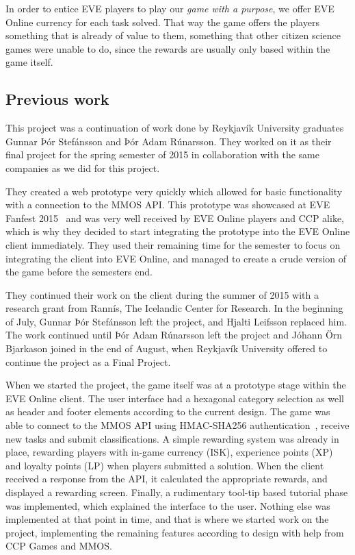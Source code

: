 In order to entice EVE players to play our \emph{game with a purpose}, we offer EVE Online currency for each task solved. That way the game offers the players something that is already of value to them, something that other citizen science games were unable to do, since the rewards are usually only based within the game itself.

\subsection{Previous work}
This project was a continuation of work done by Reykjavík University graduates Gunnar Þór Stefánsson and Þór Adam Rúnarsson. They worked on it as their final project for the spring semester of 2015 in collaboration with the same companies as we did for this project.

They created a web prototype very quickly which allowed for basic functionality with a connection to the MMOS API. This prototype was showcased at EVE Fanfest 2015~\cite{fanfest} and was very well received by EVE Online players and CCP alike, which is why they decided to start integrating the prototype into the EVE Online client immediately. They used their remaining time for the semester to focus on integrating the client into EVE Online, and managed to create a crude version of the game before the semesters end.

They continued their work on the client during the summer of 2015 with a research grant from Rannís, The Icelandic Center for Research. In the beginning of July, Gunnar Þór Stefánsson left the project, and Hjalti Leifsson replaced him. The work continued until Þór Adam Rúnarsson left the project and Jóhann Örn Bjarkason joined in the end of August, when Reykjavík University offered to continue the project as a Final Project.

When we started the project, the game itself was at a prototype stage within the EVE Online client. The user interface had a hexagonal category selection as well as header and footer elements according to the current design. The game was able to connect to the MMOS API using HMAC-SHA256 authentication~\cite{hmac}, receive new tasks and submit classifications. A simple rewarding system was already in place, rewarding players with in-game currency (ISK), experience points (XP) and loyalty points (LP) when players submitted a solution. When the client received a response from the API, it calculated the appropriate rewards, and displayed a rewarding screen. Finally, a rudimentary tool-tip based tutorial phase was implemented, which explained the interface to the user. Nothing else was implemented at that point in time, and that is where we started work on the project, implementing the remaining features according to design with help from CCP Games and MMOS.
